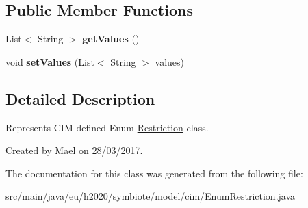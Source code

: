 \subsection*{Public Member Functions}
\begin{DoxyCompactItemize}
\item 
\mbox{\label{classeu_1_1h2020_1_1symbiote_1_1model_1_1cim_1_1EnumRestriction_a1de73adfd9054bf87935bd5097908d65}} 
List$<$ String $>$ {\bfseries get\+Values} ()
\item 
\mbox{\label{classeu_1_1h2020_1_1symbiote_1_1model_1_1cim_1_1EnumRestriction_a150fc0bc999f94d77ba0daa9d2125aeb}} 
void {\bfseries set\+Values} (List$<$ String $>$ values)
\end{DoxyCompactItemize}


\subsection{Detailed Description}
Represents C\+I\+M-\/defined Enum \hyperlink{classeu_1_1h2020_1_1symbiote_1_1model_1_1cim_1_1Restriction}{Restriction} class.

Created by Mael on 28/03/2017. 

The documentation for this class was generated from the following file\+:\begin{DoxyCompactItemize}
\item 
src/main/java/eu/h2020/symbiote/model/cim/Enum\+Restriction.\+java\end{DoxyCompactItemize}
